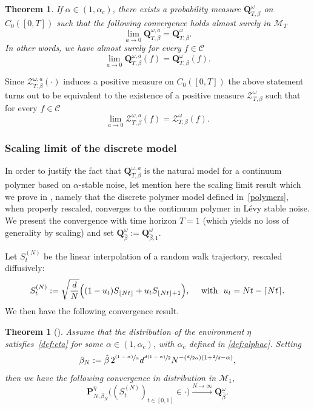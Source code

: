 \documentclass[10pt]{amsart}
\let\mathcal\mathscr
\newcommand{\Psfrac}[2]{(\sfrac{#1}{#2})}
\newcommand{\psfrac}[2]{\sfrac{(#1)}{#2}}
\newtheorem{theorema}{Theorem}
\newtheorem{theorem}{Theorem}[section]
\theoremstyle{definition}
\newcommand{\cC}{{\ensuremath{\mathcal C}} }
\newcommand{\cM}{{\ensuremath{\mathcal M}} }
\newcommand{\cZ}{{\ensuremath{\mathcal Z}} }
\newcommand{\bP}{{\ensuremath{\mathbf P}} }
\newcommand{\bQ}{{\ensuremath{\mathbf Q}} }
\let\ga\alpha
\let\go\omega
\begin{document}
\begin{theorem}\label{thm:contmeasure}
If $\ga\in (1,\ga_c)$, there exists a probability measure
$\bQ^{\go}_{T,\beta}$ on $C_0([0,T])$ such that
the following convergence holds almost surely in $\cM_T$
\[
\lim_{a\to 0} \bQ^{\go,a}_{T,\beta}= \bQ^{\go}_{T,\beta}.
\]
In other words, we have almost surely for every $f\in \cC$
\begin{equation}
\lim_{a\to 0} \bQ^{\go,a}_{T,\beta}(f)= \bQ^{\go}_{T,\beta}(f).
\end{equation}
\end{theorem}
Since
$\cZ^{\go,a }_{T, \beta}(\cdot)$ induces a positive measure on $C_0([0,T])$ the above statement turns out to be equivalent to the existence of a positive measure $\cZ^{\go}_{T, \beta}$ such that for every $f\in \cC$
\begin{equation}
\lim_{a \to 0}\cZ^{\go,a }_{T, \beta}(f)=\cZ^{\go}_{T, \beta}(f).
\end{equation}

\subsubsection{Scaling limit of the discrete model}

In order to justify the fact that $\bQ^{\go,a}_{T,\beta}$ is the natural model for a continuum polymer based on $\alpha$-stable noise, let mention here the scaling limit result which we prove in \cite{BL20_disc},
namely that the discrete polymer model defined in~\eqref{polymers},
when properly rescaled, converges to the continuum
polymer in Lévy stable noise.
We present the convergence with time horizon $T=1$ (which yields no loss of generality by scaling) and set $\bQ^{\go }_{ \hat \beta}:= \bQ^{\go }_{ \hat \beta,1}$.

Let $S_t^{(N)}$ be the linear interpolation
of a random walk trajectory, rescaled diffusively:\vspace*{-3pt}\enlargethispage{\baselineskip}%
\begin{equation}\label{defsn}
S^{(N)}_t:= \sqrt{\frac{d}{N}} \Bigl((1-u_t) S_{\lfloor Nt \rfloor} +u_t S_{\lfloor Nt \rfloor+1} \Bigr),
\quad \text{ with } \ u_t= Nt-\lceil N t \rceil.
\end{equation}
We then have the following convergence result.

\begin{theorema}[\cf \cite{BL20_disc}]
\label{thm:conv}
Assume that the distribution of the environment $\eta$ satisfies~\eqref{def:eta} for some $\alpha\in (1,\alpha_c)$, with $\alpha_c$ defined in \eqref{def:alphac}.
Setting
\begin{equation}\label{scalechoice}
\beta_N:= \hat \beta\, 2^{\psfrac{1-\ga}{\alpha}} d^{\sfrac{d(1-\alpha)}{2}} N^{- \Psfrac{d}{2\ga} (1+ \sfrac{2}{d}-\alpha) },
\end{equation}
then we have the following convergence in distribution in $\cM_1$,
\begin{equation}
\bP^{\eta}_{N,\beta_N}\bigl((S^{(N)}_t)_{t\in [0,1]} \in \cdot \bigr) \stackrel{N\to \infty}\to \bQ^{\go }_{ \hat \beta}.
\end{equation}
\end{theorema}
\end{document}
